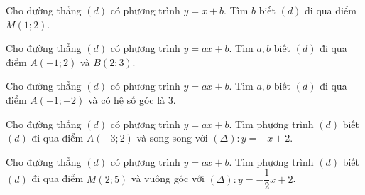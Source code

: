 \begin{vd}%
	Cho đường thẳng $(d)$ có phương trình $y=x+b$. Tìm $b$ biết $(d)$ đi qua điểm $M(1;2)$.
\end{vd}
\begin{vd}%
	Cho đường thẳng $(d)$ có phương trình $y=ax+b$. Tìm $a,b$ biết $(d)$ đi qua điểm $A(-1;2)$ và $B(2;3)$.
\end{vd}
\begin{vd}%
	Cho đường thẳng $(d)$ có phương trình $y=ax+b$. Tìm $a,b$ biết $(d)$ đi qua điểm $A(-1;-2)$ và có hệ số góc là $3$.
\end{vd}
\begin{vd}%
	Cho đường thẳng $(d)$ có phương trình $y=ax+b$. Tìm phương trình $(d)$ biết $(d)$ đi qua điểm $A(-3;2)$ và song song với $(\Delta):y=-x+2$.
\end{vd}
\begin{vd}%
	Cho đường thẳng $(d)$ có phương trình $y=ax+b$. Tìm phương trình $(d)$ biết $(d)$ đi qua điểm $M(2;5)$ và vuông góc với $(\Delta):y=-\dfrac{1}{2}x+2$.
\end{vd}
